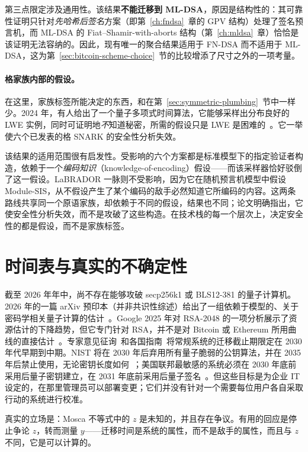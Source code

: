 第三点限定涉及通用性。该结果\textbf{不能迁移到 ML-DSA}，原因是结构性的：其可靠性证明只针对\emph{先哈希后签名}方案（即第~\ref{ch:fndsa}~章的 GPV 结构）处理了签名预言机，而 ML-DSA 的 Fiat--Shamir-with-aborts 结构（第~\ref{ch:mldsa}~章）恰恰是该证明无法容纳的。因此，现有唯一的聚合结果适用于 FN-DSA 而不适用于 ML-DSA，这为第~\ref{sec:bitcoin-scheme-choice}~节的比较增添了尺寸之外的一项考量。

\paragraph{格家族内部的假设。}
在这里，家族标签所能决定的东西，和在第~\ref{sec:symmetric-plumbing}~节中一样少。2024 年，有人给出了一个量子多项式时间算法，它能够采样出分布良好的 LWE 实例，同时可证明地\emph{不}知道秘密，所需的假设只是 LWE 是困难的~\cite{obliviouslwe2024}。它一举使六个已发表的格 SNARK 的安全性分析失效。

该结果的适用范围很有启发性。受影响的六个方案都是标准模型下的指定验证者构造，依赖于一个\emph{编码知识}（knowledge-of-encoding）假设——而该采样器恰好驳倒了这一假设。LaBRADOR 一脉则不受影响，因为它在随机预言机模型中假设 Module-SIS，从不假设产生了某个编码的敌手必然知道它所编码的内容。这两条路线共享同一个原语家族，却依赖于不同的假设，结果也不同；论文明确指出，它使安全性分析失效，而不是攻破了这些构造。在技术栈的每一个层次上，决定安全性的都是假设，而不是家族标签。

\section{时间表与真实的不确定性}
截至 2026 年年中，尚不存在能够攻破 secp256k1 或 BLS12-381 的量子计算机。2026 年的一篇 arXiv 预印本（并非共识性综述）给出了一组依赖于模型的、关于密码学相关量子计算的估计~\cite{quantumhorizon2026}。Google 2025 年对 RSA-2048 的一项分析展示了资源估计的下降趋势，但它专门针对 RSA，并不是对 Bitcoin 或 Ethereum 所用曲线的直接估计~\cite{gidney2025}。专家意见征询~\cite{mosca2025}和各国指南~\cite{nistir8547,ncscpqc2025,cnsa2}将常规系统的迁移截止期限定在 2030 年代早期到中期。NIST 将在 2030 年后弃用所有量子脆弱的公钥算法，并在 2035 年后禁止使用，无论密钥长度如何~\cite{nistir8547}；美国联邦最敏感的系统必须在 2030 年底前采用后量子密钥建立，在 2031 年底前采用后量子签名~\cite{eo14412,ombm2615}。但这些目标是为企业 IT 设定的，在那里管理员可以部署变更；它们并没有针对一个需要每位用户各自采取行动的系统进行校准。

真实的立场是：Mosca 不等式中的 $z$ 是未知的，并且存在争议。有用的回应是停止争论 $z$，转而测量 $y$——迁移时间是系统的属性，而不是敌手的属性，而且与 $z$ 不同，它是可以计算的。

